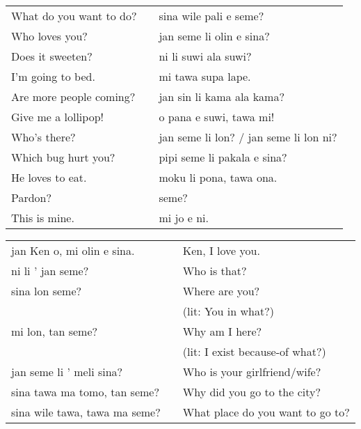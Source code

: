 \begin{supertabular}{p{5,5cm}|ll}
    What do you want to do? &  & sina wile pali e seme?                 \\
    Who loves you?          &  & jan seme li olin e sina?               \\
    Does it sweeten?        &  & ni li suwi ala suwi?                   \\
    I'm going to bed.       &  & mi tawa supa lape.                     \\
    Are more people coming? &  & jan sin li kama ala kama?              \\
    Give me a lollipop!     &  & o pana e suwi, tawa mi!                \\
    Who's there?            &  & jan seme li lon? / jan seme li lon ni? \\
    Which bug hurt you?     &  & pipi seme li pakala e sina?            \\
    He loves to eat.        &  & moku li pona, tawa ona.                \\
    Pardon?                 &  & seme?                                  \\
    This is mine.           &  & mi jo e ni.                            \\
\end{supertabular}

\begin{supertabular}{p{5,5cm}|ll}
    jan Ken o, mi olin e sina.    &  & Ken, I love you.                 \\
    ni li ' jan seme?             &  & Who is that?                     \\
    sina lon seme?                &  & Where are you?                   \\
                                  &  & (lit: You in what?)              \\
    mi lon, tan seme?             &  & Why am I here?                   \\
                                  &  & (lit: I exist because-of what?)  \\
    jan seme li ' meli sina?      &  & Who is your girlfriend/wife?     \\
    sina tawa ma tomo, tan seme?  &  & Why did you go to the city?      \\
    sina wile tawa, tawa ma seme? &  & What place do you want to go to? \\
\end{supertabular}

